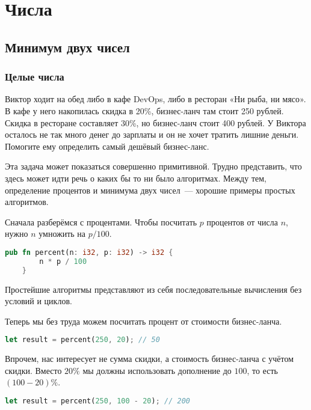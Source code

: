 \chapter{Числа}

\section{Минимум двух чисел}

\subsection{Целые числа}

\begin{Exercise}
    \Question
    Виктор ходит на обед либо в кафе DevOps, либо в ресторан «Ни рыба, ни мясо».
    В кафе у него накопилась скидка в 20\%, бизнес-ланч там стоит 250 рублей.
    Скидка в ресторане составляет 30\%, но бизнес-ланч стоит 400 рублей.
    У Виктора осталось не так много денег до зарплаты и он не хочет тратить лишние деньги.
    Помогите ему определить самый дешёвый бизнес-ланс.
\end{Exercise}

Эта задача может показаться совершенно примитивной.
Трудно представить, что здесь может идти речь о каких бы то ни было алгоритмах.
Между тем, определение процентов и минимума двух чисел~--- хорошие примеры простых алгоритмов.

Сначала разберёмся с процентами.
Чтобы посчитать $p$ процентов от числа $n$, нужно $n$ умножить на $p/100$.

\begin{lstlisting}[language=Rust]
    pub fn percent(n: i32, p: i32) -> i32 {
        n * p / 100
    }
\end{lstlisting}

Простейшие алгоритмы представляют из себя последовательные вычисления без условий и циклов.

Теперь мы без труда можем посчитать процент от стоимости бизнес-ланча.

\begin{lstlisting}[language=Rust]
    let result = percent(250, 20); // 50
\end{lstlisting}


Впрочем, нас интересует не сумма скидки, а стоимость бизнес-ланча с учётом скидки.
Вместо $20\%$ мы должны использовать дополнение до $100$, то есть $(100 - 20)\%$.

\begin{lstlisting}[language=Rust]
    let result = percent(250, 100 - 20); // 200
\end{lstlisting}

